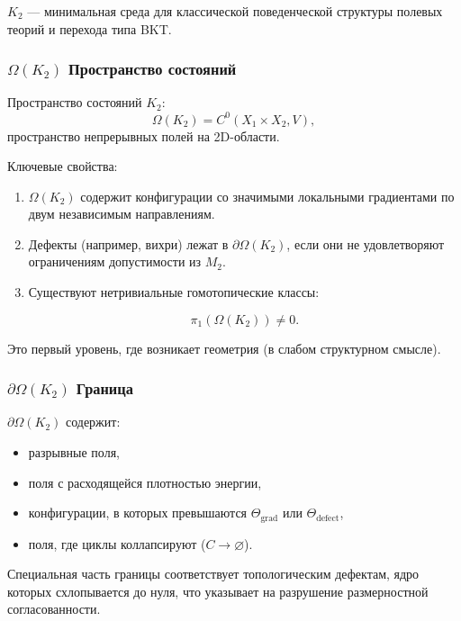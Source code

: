 $K_2$ — минимальная среда для классической поведенческой
структуры полевых теорий и перехода типа BKT.

\subsubsection{\texorpdfstring{$\Omega(K_2)$}{\Omega(K_2)} Пространство состояний}

Пространство состояний $K_2$:
\[
\Omega(K_2) = C^0(X_1 \times X_2, V),
\]
пространство непрерывных полей на 2D-области.

Ключевые свойства:
\begin{enumerate}
    \item $\Omega(K_2)$ содержит конфигурации со значимыми локальными
          градиентами по двум независимым направлениям.
    \item Дефекты (например, вихри) лежат в $\partial\Omega(K_2)$,
          если они не удовлетворяют ограничениям допустимости из $M_2$.
    \item Существуют нетривиальные гомотопические классы:

          \[
          \pi_1(\Omega(K_2)) \neq 0.
          \]
\end{enumerate}

Это первый уровень, где возникает геометрия (в слабом структурном смысле).

\subsubsection{\texorpdfstring{$\partial\Omega(K_2)$}{\partial\Omega(K_2)} Граница}

$\partial\Omega(K_2)$ содержит:
\begin{itemize}
    \item разрывные поля,
    \item поля с расходящейся плотностью энергии,
    \item конфигурации, в которых превышаются $\Theta_{\mathrm{grad}}$ или
          $\Theta_{\mathrm{defect}}$,
    \item поля, где циклы коллапсируют ($C \to \varnothing$).
\end{itemize}

Специальная часть границы соответствует топологическим дефектам,
ядро которых схлопывается до нуля, что указывает на разрушение
размерностной согласованности.

